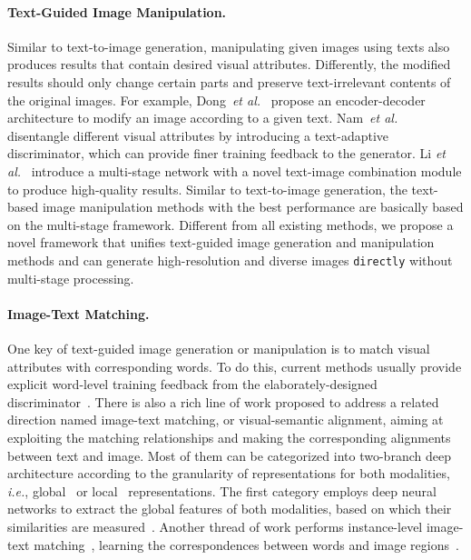 \documentclass[final]{cvpr}
\def\ie{\emph{i.e.}}
\def\etal{\emph{et al.}}
\begin{document}
\paragraph{Text-Guided Image Manipulation.}
Similar to text-to-image generation, manipulating given images using texts also produces results that contain desired visual attributes. 
Differently, the modified results should only change certain parts and preserve text-irrelevant contents of the original images. 
For example, Dong~\etal~\cite{dong2017semantic} propose an encoder-decoder architecture to modify an image according to a given text.
Nam~\etal~\cite{nam2018text} disentangle different visual attributes by introducing a text-adaptive discriminator, which can provide finer training feedback to the generator. 
Li \etal~\cite{li2020manigan} introduce a multi-stage network with a novel text-image combination module to produce high-quality results.
Similar to text-to-image generation, the text-based image manipulation methods with the best performance are basically based on the multi-stage framework.
Different from all existing methods, we propose a novel framework that unifies text-guided image generation and manipulation methods and can generate high-resolution and diverse images \texttt{directly} without multi-stage processing.

\vspace{-5pt}
\paragraph{Image-Text Matching.} 
One key of text-guided image generation or manipulation is to match visual attributes with corresponding words. To do this, current methods usually provide explicit word-level training feedback from the elaborately-designed discriminator~\cite{li2020manigan,li2020lightweight}.
There is also a rich line of work proposed to address a related direction named image-text matching, or visual-semantic alignment, aiming at exploiting the matching relationships and making the corresponding alignments between text and image.
Most of them can be categorized into two-branch deep architecture according to the granularity of representations for both modalities, \ie, global~\cite{kiros2014unifying,mao2014deep,ma2015multimodal} or local~\cite{karpathy2014deep,karpathy2015deep,lee2018stacked} representations.
The first category employs deep neural networks to extract the global features of both modalities, based on which their similarities are measured~\cite{mao2014deep}.
Another thread of work performs instance-level image-text matching~\cite{nam2017dual,lee2018stacked,song2019polysemous}, learning the correspondences between words and image regions~\cite{karpathy2015deep}.
\end{document}
